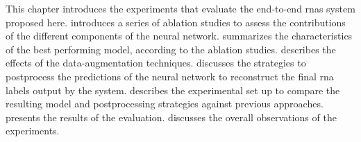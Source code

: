 
This chapter introduces the experiments that evaluate the
end-to-end \glspl{rna} system proposed here.
 introduces a series of ablation
studies to assess the contributions of the different
components of the neural network.
 summarizes the
characteristics of the best performing model, according to
the ablation studies. 
describes the effects of the data-augmentation techniques.
discusses the strategies to postprocess the predictions of
the neural network to reconstruct the final \gls{rna} labels
output by the system.
 describes the
experimental set up to compare the resulting model and
postprocessing strategies against previous approaches.
 presents the results of the evaluation.
 discusses the overall observations of
the experiments. 
